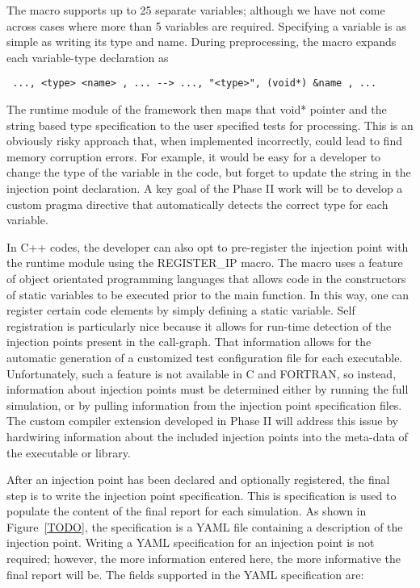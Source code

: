 The macro supports up to 25 separate variables; although we have not come across cases where more than 5 variables are required. Specifying a variable is as simple 
as writing its type and name. During preprocessing, the macro expands each variable-type declaration as 
\begin{verbatim}
 ..., <type> <name> , ... --> ..., "<type>", (void*) &name , ... 
\end{verbatim}

The runtime module of the framework then maps that void* pointer and the string based type specification to the user specified tests for processing. This is
an obviously risky approach that, when implemented incorrectly, could lead to find memory corruption errors. For example, it would be easy for a developer to
change the type of the variable in the code, but forget to update the string in the injection point declaration. A key goal of the Phase II work will be to 
develop a custom pragma directive that automatically detects the correct type for each variable. 

In C++ codes, the developer can also opt to pre-register the injection point with the runtime module using the REGISTER_IP macro. The macro uses a feature of object orientated programming languages that allows code in the constructors of static variables to be executed prior to the main function. In this way, one can register certain code elements by simply defining a static variable. Self registration is particularly nice because it allows for run-time detection of the injection points present in the call-graph. That information allows for the automatic generation of a customized test configuration file for each executable. Unfortunately, such a feature is not available in C and FORTRAN, so instead, information about injection points must be determined either by running the full simulation, or by pulling information from the injection point specification files. The custom compiler extension developed in Phase II will address this issue by hardwiring information about the included injection points into the meta-data of the executable or library. 

After an injection point has been declared and optionally registered, the final step is to write the injection point specification. This is specification
is used to populate the content of the final \VV report for each simulation. As shown in Figure~\ref{TODO}, the specification is a YAML file containing a description of the injection point. Writing a YAML specification 
for an injection point is not required; however, the more information entered here, the more informative the final report will be. The fields supported in the YAML specification are:

